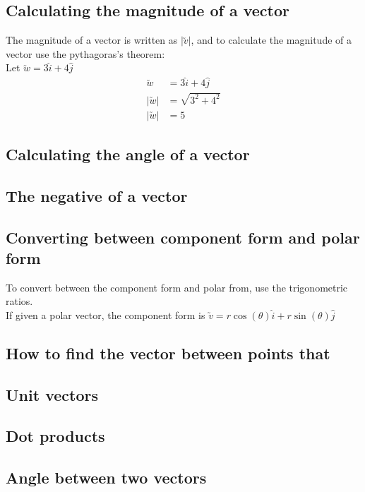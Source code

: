 \documentclass[a4paper,10pt]{report}
\begin{document}
\subsection{Calculating the magnitude of a vector}
The magnitude of a vector is written as $|\utilde{v}|$, and to calculate the magnitude of a vector use the pythagoras's theorem:\\
Let $\utilde{w} = 3\hat{i} + 4\hat{j}$
\begin{align*}
	\utilde{w}   & = 3\hat{i} + 4\hat{j}  \\
	|\utilde{w}| & = \sqrt{{3}^2 + {4}^2} \\
	|\utilde{w}| & = 5
\end{align*}

\subsection{Calculating the angle of a vector}

\subsection{The negative of a vector}

\subsection{Converting between component form and polar form}
To convert between the component form and polar from, use the trigonometric ratios.\\
If given a polar vector, the component form is $\utilde{v} = r\cos(\theta)\hat{i} + r\sin(\theta)\hat{j}$

\subsection{How to find the vector between points that}

\subsection{Unit vectors}

\subsection{Dot products}

\subsection{Angle between two vectors}
\end{document}
